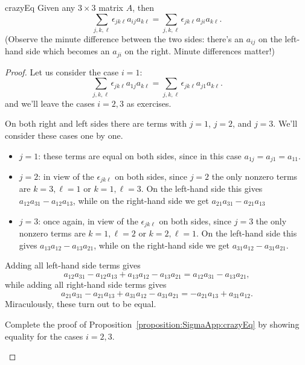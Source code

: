 \begin{prop}{crazyEq} Given any $3 \times 3$ matrix $A$, then 
\[ \sum_{j,k,\ell}\epsilon_{jk\ell} a_{ij}a_{k\ell} =  \sum_{j,k,\ell}\epsilon_{jk\ell} a_{ji}a_{k\ell}. \]
(Observe the minute difference between the two sides:  there's an $a_{ij}$ on the left-hand side which becomes an $a_{ji}$ on the right. Minute differences matter!)
\end{prop}
\begin{proof}
Let us consider the case $i=1$:
\[ \sum_{j,k,\ell}\epsilon_{jk\ell} a_{1j}a_{k\ell} =  \sum_{j,k,\ell}\epsilon_{jk\ell} a_{j1}a_{k\ell}. \]
 and we'll leave the cases $i=2,3$ as exercises.

On both right and left sides there are terms with $j=1$, $j=2$, and $j=3$.  We'll consider these cases one by one.
\begin{itemize}
\item
$j=1$: these terms are equal on both sides, since in this case $a_{1j}=a_{j1}=a_{11}$.
\item
$j=2$: in view of the $\epsilon_{jk\ell}$ on both sides, since $j=2$ the only nonzero terms are $k=3, \ell=1$  or $k=1, \ell = 3$.  On the left-hand side this gives $a_{12}a_{31} - a_{12}a_{13}$, while on the right-hand side we get $a_{21}a_{31} - a_{21}a_{13}$
\item
$j=3$: once again, in view of the $\epsilon_{jk\ell}$ on both sides, since $j=3$ the only nonzero terms are $k=1, \ell=2$  or $k=2, \ell = 1$.  On the left-hand side this gives $a_{13}a_{12} - a_{13}a_{21}$, while on the right-hand side we get $a_{31}a_{12} - a_{31}a_{21}$.
\end{itemize}
Adding all left-hand side terms gives
\[ a_{12}a_{31} - a_{12}a_{13} + a_{13}a_{12} - a_{13}a_{21} = a_{12}a_{31}  - a_{13}a_{21},\]
while adding all right-hand side terms gives
\[a_{21}a_{31} - a_{21}a_{13} + a_{31}a_{12} - a_{31}a_{21} = - a_{21}a_{13} + a_{31}a_{12}.\]
Miraculously, these turn out to be equal.

\begin{exercise}{} Complete the proof of Proposition~\ref{proposition:SigmaApp:crazyEq} by showing equality for the cases $i=2,3$.
\end{exercise}
\end{proof}

